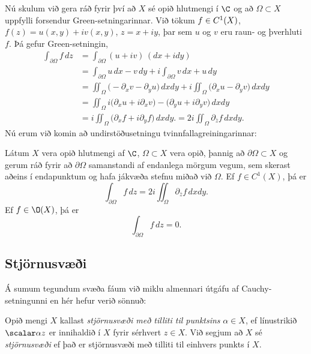 Nú skulum við gera ráð fyrir því að $X$ sé opið hlutmengi í $\C$ og
að $\Omega\subset X$ uppfylli forsendur Green-setningarinnar.  Við
tökum $f\in C\sp 1(X)$, $f(z)=u(x,y)+iv(x,y)$, $z=x+iy$, þar sem $u$ og
$v$ eru raun-  og  þverhluti $f$.
Þá gefur Green-setningin,
\begin{align*}
\int_{\partial\Omega} f\, dz 
&=\int_{\partial\Omega} (u+iv)\, (dx+idy)\label{10.2.1}\\
&=\int_{\partial\Omega} u\, dx - v\, dy
+i\int_{\partial\Omega} v\, dx + u\, dy\nonumber\\
&=\iint_{\Omega}\big(-\partial_x v-\partial_y u\big) \, dxdy
+i\iint_{\Omega}\big(\partial_x u-\partial_y v\big) \, dxdy\nonumber\\
&=\iint_{\Omega}i\big(\partial_x u+i\partial_x v\big)-
\big(\partial_y u+i\partial_y v \big) \, dxdy \nonumber\\
&=i\iint_{\Omega}\big(\partial_x f+i\partial_y f\big) \, dxdy.
=2i\iint_{\Omega}\partial_{\bar z} f \, dxdy.\nonumber
\end{align*}
Nú erum við komin að undirstöðusetningu tvinnfallagreiningarinnar:

\begin{se}
Látum $X$ vera opið hlutmengi af $\C$, $\Omega\subset X$ vera opið,
þannig að $\partial\Omega\subset X$ og gerum ráð fyrir að
$\partial\Omega$ samanstandi af endanlega mörgum vegum, sem skerast
aðeins í endapunktum og hafa jákvæða stefnu miðað við ${\Omega}$.
Ef $f\in C^1(X)$, þá er
\begin{equation*}\int_{\partial\Omega}f\, dz = 
2i\iint_{\Omega}\partial_{\bar z} f \, dxdy.
\label{10.2.2}
\end{equation*}
Ef $f\in \O(X)$, þá er
\begin{equation*}
\int_{\partial\Omega}f\, dz = 0.
\label{10.2.3}
\end{equation*}
\end{se}



\subsection*{Stjörnusvæði}


Á sumum tegundum svæða fáum við miklu almennari útgáfu af
Cauchy-setningunni en hér hefur verið sönnuð: 

\begin{sk}
Opið mengi $X$ kallast {\it stjörnusvæði með tilliti til punktsins }
$\alpha\in X$, ef línustrikið $\scalar \alpha z$ er innihaldið í $X$
fyrir sérhvert $z\in X$.  Við segjum að $X$ sé {\it
stjörnusvæði} ef
það er stjörnusvæði með tilliti til einhvers punkts í $X$.
\end{sk}


